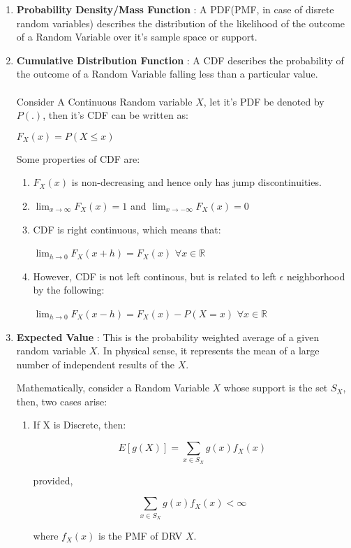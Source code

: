 \documentclass[12pt, a4paper, titlepage]{article}
\begin{document}
\begin{enumerate}

	\item{\textbf{Probability Density/Mass Function} : A PDF(PMF, in case of disrete random variables) describes the distribution of the likelihood of the outcome of a Random Variable over it's sample space or support.}

	\item{\textbf{Cumulative Distribution Function} : A CDF describes the probability of the outcome of a Random Variable falling less than a particular value.\\\\Consider A Continuous Random variable $X$, let it's PDF be denoted by $P(.)$, then it's CDF can be written as: 
\begin{center}$F_X(x)  = P(X \le x)$\end{center}

 Some properties of CDF are: 
\begin{enumerate}

	\item{$F_X(x)$ is non-decreasing and hence only has jump discontinuities.}
	\item{$\lim_{x \to \infty} F_X(x) = 1 $ and $\lim_{x \to -\infty} F_X(x) = 0 $}
	\item{CDF is right continuous, which means that: 
		\begin{center} $\lim_{h \to 0}F_X(x + h) = F_X(x)$  $\forall x \in \mathbb{R}$ \end{center}}
	\item{However, CDF is not left continous, but is related to left $\epsilon$ neighborhood by the following:
		\begin{center} $\lim_{h \to 0}F_X(x - h) = F_X(x) - P(X = x)$ $\forall x \in \mathbb{R}$\end{center}}

\end{enumerate}

}

	\item{\textbf{Expected Value} : This is the probability weighted average of a given random variable $X$. In physical sense, it represents the mean of a large number of independent results of the $X$.

Mathematically, consider a Random Variable $X$ whose support is the set $S_X$, then, two cases arise:
\begin{enumerate}

	\item{If X is Discrete, then: \begin{center} $$E\left[g(X)\right] = \sum_{x \in S_X} g(x) f_X(x) $$ \end{center}
			provided,  \begin{center} $$\sum_{x \in S_X} g(x) f_X(x) < \infty$$ \end{center}
			where $f_X(x)$ is the PMF of DRV $X$.}\\


\end{enumerate}}
\end{enumerate}
\end{document}
